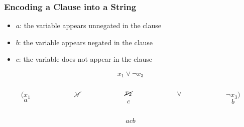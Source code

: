 \documentclass{beamer}
\begin{document}
\begin{frame}
    \frametitle{Encoding a Clause into a String}

    \begin{itemize}
        \item $a$: the variable appears unnegated in the clause
              \pause
        \item $b$: the variable appears negated in the clause
              \pause
        \item $c$: the variable does not appear in the clause
    \end{itemize}

    \pause

    \begin{Large}
        $$x_1\vee \neg x_3$$

        \pause

        \begin{columns}
            \begin{column}{1cm}
                $$({x_1}$$$$a$$
            \end{column}
            \pause
            \begin{column}{1cm}
                $$\cancel{\vee}$$$$\ $$
            \end{column}
            \begin{column}{1cm}
                $$\cancel{x_2}$$$$c$$
            \end{column}
            \pause
            \begin{column}{1cm}
                $$\vee$$$$\ $$
            \end{column}
            \begin{column}{1cm}
                $$\neg{x_3})$$$$b$$
            \end{column}
        \end{columns}

        \pause

        $$acb$$
    \end{Large}
\end{frame}
\end{document}
